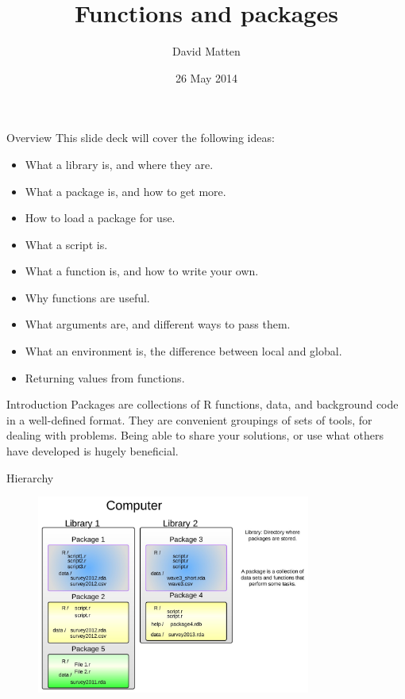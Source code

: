\documentclass{beamer}\usepackage[]{graphicx}\usepackage[]{color}
\begin{document}
\title{Functions and packages}
\author{David Matten}
\date{26 May 2014}

\maketitle


\begin{frame}[fragile]{Overview}
This slide deck will cover the following ideas:
\begin{itemize}
\item What a library is, and where they are.
\item What a package is, and how to get more.
\item How to load a package for use.
\item What a script is.
\item What a function is, and how to write your own.
\item Why functions are useful.
\item What arguments are, and different ways to pass them.
\item What an environment is, the difference between local and global.
\item Returning values from functions.
\end{itemize}

\end{frame}


\begin{frame}[fragile]{Introduction}
Packages are collections of R functions, data, and background code in a well-defined format.
\linebreak
\linebreak
They are convenient groupings of sets of tools, for dealing with problems.
\linebreak
\linebreak
Being able to share your solutions, or use what others have developed is hugely beneficial.
\end{frame}


\begin{frame}[fragile]{Hierarchy}

\begin{figure}[ht!]
\centering
\includegraphics[width=90mm]{pictures/library_function_heirachy.jpeg}
\label{overflow}
\end{figure}

\end{frame}
\end{document}
